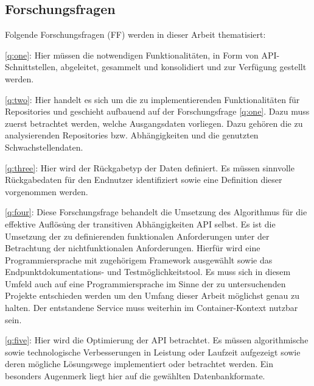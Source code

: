 \subsection{Forschungsfragen} \label{sec:Forschungsfragen}
    Folgende Forschungsfragen (FF) werden in dieser Arbeit thematisiert:

    \ref{q:one}:
    Hier müssen die notwendigen Funktionalitäten, in Form von \ac{API}-Schnittstellen, abgeleitet, gesammelt und konsolidiert und zur Verfügung gestellt werden.

    \ref{q:two}:
    Hier handelt es sich um die zu implementierenden Funktionalitäten für Repositories und geschieht aufbauend auf der Forschungsfrage \ref{q:one}.
    Dazu muss zuerst betrachtet werden, welche Ausgangsdaten vorliegen.
    Dazu gehören die zu analysierenden Repositories bzw. Abhängigkeiten und die genutzten Schwachstellendaten.

    \ref{q:three}:
    Hier wird der Rückgabetyp der Daten definiert.
    Es müssen sinnvolle Rückgabedaten für den Endnutzer identifiziert sowie eine Definition dieser vorgenommen werden.

    \ref{q:four}:
    Diese Forschungsfrage behandelt die Umsetzung des Algorithmus für die effektive Auf\-lös\.ung der transitiven Abhängigkeiten \ac{API} selbst.
    Es ist die Umsetzung der zu definierenden funktionalen Anforderungen unter der Betrachtung der nichtfunktionalen Anforderungen.
    Hierfür wird eine Programmiersprache mit zugehörigem Framework ausgewählt sowie das End\-punkt\-doku\-mentations- und Test\-möglich\-keits\-tool.
    Es muss sich in diesem Umfeld auch auf eine Programmiersprache im Sinne der zu untersuchenden Projekte entschieden werden um den Umfang dieser Arbeit möglichst genau zu halten.
    Der entstandene Service muss weiterhin im Container-Kontext nutzbar sein.

    \ref{q:five}:
    Hier wird die Optimierung der \ac{API} betrachtet.
    Es müssen algorithmische sowie technologische Verbesserungen in Leistung oder Laufzeit aufgezeigt sowie deren mögliche Lösungswege implementiert oder betrachtet werden.
    Ein besonders Augenmerk liegt hier auf die gewählten Datenbankformate.
